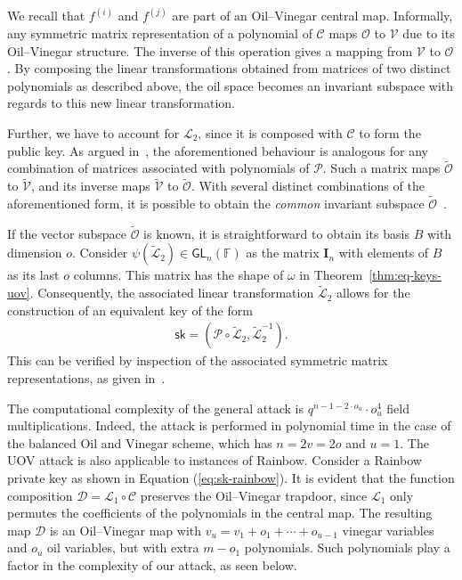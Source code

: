 \documentclass[english]{ufsc-thesis-rn46-2019/ufsc-thesis-rn46-2019}
\theoremstyle{definition}
\begin{document}
We recall that $f^{(i)}$ and $f^{(j)}$ are part of an Oil--Vinegar central
map. Informally, any symmetric matrix representation of a polynomial of
$\mathcal{C}$ maps $\mathcal{O}$ to $\mathcal{V}$ due to its Oil--Vinegar
structure. The inverse of this operation gives a mapping from $\mathcal{V}$ to
$\mathcal{O}$. By composing the linear transformations obtained from matrices
of two distinct polynomials as described above, the oil space becomes an
invariant subspace with regards to this new linear transformation.

Further, we have to account for $\mathcal{L}_{2}$, since it is composed with
$\mathcal{C}$ to form the public key. As argued
in~\cite[p.~261]{Kipnis:199808}, the aforementioned behaviour is analogous for
any combination of matrices associated with polynomials of $\mathcal{P}$. Such
a matrix maps $\widetilde{\mathcal{O}}$ to $\widetilde{\mathcal{V}}$, and its
inverse maps $\widetilde{\mathcal{V}}$ to $\widetilde{\mathcal{O}}$. With
several distinct combinations of the aforementioned form, it is possible to
obtain the \emph{common} invariant subspace
$\widetilde{\mathcal{O}}$~\cite[Thm.~1]{Kipnis:199904}.

If the vector subspace $\widetilde{\mathcal{O}}$ is known, it is
straightforward to obtain its basis $B$ with dimension $o$. Consider
$\psi(\widetilde{\mathcal{L}}_{2}) \in \textsf{GL}_{n}(\mathbb{F})$ as the
matrix $\mathbf{I}_{n}$ with elements of $B$ as its last $o$ columns. This
matrix has the shape of $\omega$ in
Theorem~\ref{thm:eq-keys-uov}. Consequently, the associated linear
transformation $\widetilde{\mathcal{L}}_{2}$ allows for the construction of an
equivalent key of the form
\begin{align}\label{eq:uov-attack-eq}
  \textsf{sk} = (\mathcal{P} \circ \widetilde{\mathcal{L}}_{2},
    \widetilde{\mathcal{L}}_{2}^{-1}).
\end{align}
This can be verified by inspection of the associated symmetric matrix
representations, as given in~\cite[p.~71]{Ding:2006}.

The computational complexity of the general attack is
$q^{n - 1 - 2 \cdot o_{u}} \cdot o_{u}^{4}$ field multiplications. Indeed, the
attack is performed in polynomial time in the case of the balanced Oil and
Vinegar scheme, which has $n = 2v = 2o$ and $u = 1$. The UOV attack is also
applicable to instances of Rainbow. Consider a Rainbow private key as shown in
Equation (\ref{eq:sk-rainbow}). It is evident that the function composition
$\mathcal{D} = \mathcal{L}_{1} \circ \mathcal{C}$ preserves the Oil--Vinegar
trapdoor, since $\mathcal{L}_{1}$ only permutes the coefficients of the
polynomials in the central map. The resulting map $\mathcal{D}$ is an
Oil--Vinegar map with $v_{u} = v_{1} + o_{1} + \cdots + o_{u - 1}$ vinegar
variables and $o_{u}$ oil variables, but with extra $m - o_{1}$
polynomials. Such polynomials play a factor in the complexity of our attack, as
seen below.
\end{document}
